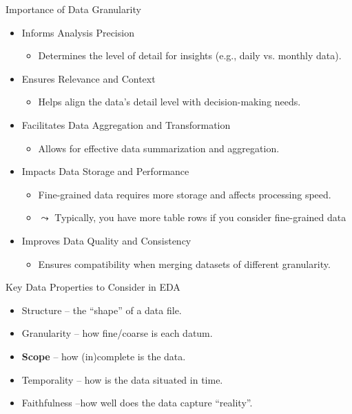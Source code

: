 \documentclass[aspectratio=169]{../latex_main/tntbeamer}  %
\begin{document}
\begin{frame}{Importance of Data Granularity}

\begin{itemize}
    \item {Informs Analysis Precision}
    \begin{itemize}
        \item Determines the level of detail for insights (e.g., daily vs. monthly data).
    \end{itemize}
\pause
    \item {Ensures Relevance and Context}
    \begin{itemize}
        \item Helps align the data's detail level with decision-making needs.
    \end{itemize}
\pause
    \item {Facilitates Data Aggregation and Transformation}
    \begin{itemize}
        \item Allows for effective data summarization and aggregation.
    \end{itemize}
\pause
    \item {Impacts Data Storage and Performance}
    \begin{itemize}
        \item Fine-grained data requires more storage and affects processing speed.
        \item $\leadsto$ Typically, you have more table rows if you consider fine-grained data
    \end{itemize}
\pause
    \item {Improves Data Quality and Consistency}
    \begin{itemize}
        \item Ensures compatibility when merging datasets of different granularity.
    \end{itemize}
\end{itemize}

\end{frame}

\begin{frame}[c]{Key Data Properties to Consider in EDA}
    \begin{itemize}
        \item {Structure} -- the “shape” of a data file.
        \item {Granularity} -- how fine/coarse is each datum.
        \item \textbf{Scope} -- how (in)complete is the data.
        \item {Temporality} -- how is the data situated in time.
        \item {Faithfulness} --how well does the data capture “reality”.
    \end{itemize}
\end{frame}
\end{document}
